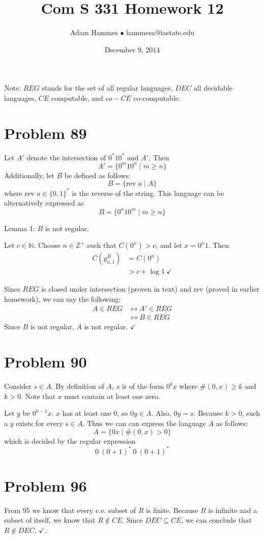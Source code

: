 \documentclass[11pt]{article}
\let\iff\leftrightarrow
\begin{document}
\title{Com S 331 Homework 12}
\author{Adam Hammes $\bullet$ hammesa@iastate.edu}
\date{December 9, 2014}
\maketitle

Note: $REG$ stands for the set of all regular languages, $DEC$ all decidable languages, $CE$ computable, and $co-CE$ co-computable.


\section*{Problem 89}

Let $A'$ denote the intersection of $0^*10^*$ and $A'$.
Then
	\[A' = \{0^m10^n \mid  m \geq n \}\]
Additionally, let $B$ be defined as follows:
	\[B = \{ \text{rev } a \mid A \} \]
where rev $a \in \{0,1\}^*$ is the reverse of the string.
This language can be alternatively expressed as
	\[ B = \{0^n10^m \mid m \geq n\}\]

Lemma 1: $B$ is not regular.

Let $c \in \mathbb{N}$.
Choose $n \in \mathbb{Z}^+$ such that $C(0^n) > c$, and let $x = 0^n1$.
Then
	\begin{align*}
		C( y^{B} _{x,1} ) &= C( 0^n) \\
		&> c + \log 1\ \checkmark
	\end{align*}

Since $REG$ is closed under intersection (proven in text) and rev (proved in earlier homework), we can say the following:
	\begin{align*}
		A \in REG &\iff A' \in REG \\
		&\iff B \in REG
	\end{align*}
Since $B$ is not regular, $A$ is not regular. $\checkmark$
 



\section*{Problem 90}

Consider $s \in A$.
By definition of $A$, $s$ is of the form $0^kx$ where $\#(0,x) \geq k$ and $k>0$.
Note that $x$ must contain at least one zero.

Let $y$ be $0^{k-1}x$. $x$ has at least one 0, so $0y \in A$.
Also, $0y = s$.
Because $k >0$, such a $y$ exists for every $s \in A$.
Thus we can can express the language $A$ as follows:
	\[ A = \{0x \mid \#(0,x) > 0 \}\]
which is decided by the regular expression
	\[ 0\ (0+1)^*\ 0\ (0+1)^*\]


\section*{Problem 96}

From 95 we know that every c.e. subset of $R$ is finite.
Because $R$ is infinite and a subset of itself, we know that $R \notin CE$.
Since $DEC \subseteq CE$, we can conclude that $R \notin DEC$. $\checkmark$.
\end{document}
